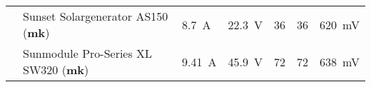 \begin{table}
\begin{tabular}{lp{20mm}lllll}
          \cite{ref:solar:as150}
        & Sunset Solargenerator AS150 (\textbf{mk})
        & \SI{8.7}{\ampere}
        & \SI{22.3}{\volt}
        & \num{36}
        & \num{36}
        & \SI{620}{\milli\volt}
        \\

          \cite{ref:solar:sunmodulePro}
        & Sunmodule Pro-Series XL SW320 (\textbf{mk})
        & \SI{9.41}{\ampere}
        & \SI{45.9}{\volt}
        & \num{72}
        & \num{72}
        & \SI{638}{\milli\volt}
        \\

        \bottomrule
    \end{tabular}
\end{table}


%
%
%
